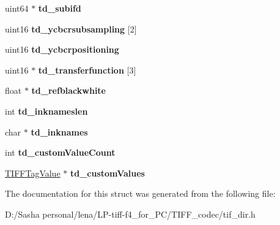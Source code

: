 \begin{DoxyCompactItemize}
\item 
\hypertarget{struct_t_i_f_f_directory_a36451b65d505e40d0197ef0e54e2f6d4}{}uint64 $\ast$ {\bfseries td\+\_\+subifd}\label{struct_t_i_f_f_directory_a36451b65d505e40d0197ef0e54e2f6d4}

\item 
\hypertarget{struct_t_i_f_f_directory_a9577c5a6160c85364a9a2658b893503b}{}uint16 {\bfseries td\+\_\+ycbcrsubsampling} \mbox{[}2\mbox{]}\label{struct_t_i_f_f_directory_a9577c5a6160c85364a9a2658b893503b}

\item 
\hypertarget{struct_t_i_f_f_directory_a4c11b72f3d18316da627769ef0b2e156}{}uint16 {\bfseries td\+\_\+ycbcrpositioning}\label{struct_t_i_f_f_directory_a4c11b72f3d18316da627769ef0b2e156}

\item 
\hypertarget{struct_t_i_f_f_directory_a38d1735f16801996f0c744411b018a42}{}uint16 $\ast$ {\bfseries td\+\_\+transferfunction} \mbox{[}3\mbox{]}\label{struct_t_i_f_f_directory_a38d1735f16801996f0c744411b018a42}

\item 
\hypertarget{struct_t_i_f_f_directory_ac9961c22de6522a4db2d48d1798dc141}{}float $\ast$ {\bfseries td\+\_\+refblackwhite}\label{struct_t_i_f_f_directory_ac9961c22de6522a4db2d48d1798dc141}

\item 
\hypertarget{struct_t_i_f_f_directory_a358b2a5b6c89d5cecbfe73807b6af321}{}int {\bfseries td\+\_\+inknameslen}\label{struct_t_i_f_f_directory_a358b2a5b6c89d5cecbfe73807b6af321}

\item 
\hypertarget{struct_t_i_f_f_directory_aa6ec703e7983d8d27d5dce1c2b997ee9}{}char $\ast$ {\bfseries td\+\_\+inknames}\label{struct_t_i_f_f_directory_aa6ec703e7983d8d27d5dce1c2b997ee9}

\item 
\hypertarget{struct_t_i_f_f_directory_a754a683686b6160292b4ba2869cd10f6}{}int {\bfseries td\+\_\+custom\+Value\+Count}\label{struct_t_i_f_f_directory_a754a683686b6160292b4ba2869cd10f6}

\item 
\hypertarget{struct_t_i_f_f_directory_a0471715331d8a3943e90e6aa6508830c}{}\hyperlink{struct_t_i_f_f_tag_value}{T\+I\+F\+F\+Tag\+Value} $\ast$ {\bfseries td\+\_\+custom\+Values}\label{struct_t_i_f_f_directory_a0471715331d8a3943e90e6aa6508830c}

\end{DoxyCompactItemize}


The documentation for this struct was generated from the following file\+:\begin{DoxyCompactItemize}
\item 
D\+:/\+Sasha personal/lena/\+L\+P-\/tiff-\/f4\+\_\+for\+\_\+\+P\+C/\+T\+I\+F\+F\+\_\+codec/tif\+\_\+dir.\+h\end{DoxyCompactItemize}
